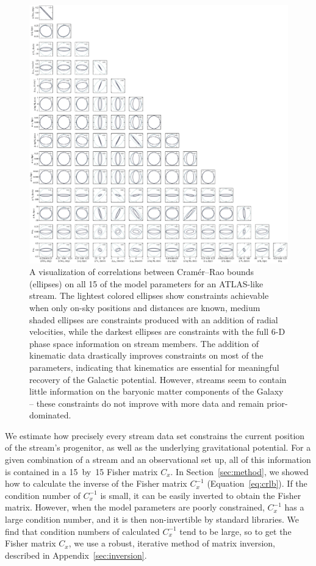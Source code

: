 \documentclass[modern]{aastex61}
\begin{document}
\begin{figure}
\begin{center}
\includegraphics[width=\textwidth]{crb_correlations.pdf}
\caption{A visualization of correlations between Cram\'er--Rao bounds (ellipses) on all 15 of the model parameters for an ATLAS-like stream.
The lightest colored ellipses show constraints achievable when only on-sky positions and distances are known, medium shaded ellipses are constraints produced with an addition of radial velocities, while the darkest ellipses are constraints with the full 6-D phase space information on stream members.
The addition of kinematic data drastically improves constraints on most of the parameters, indicating that kinematics are essential for meaningful recovery of the Galactic potential.
However, streams seem to contain little information on the baryonic matter components of the Galaxy -- these constraints do not improve with more data and remain prior-dominated.
}
\label{fig:crb_correlations}
\end{center}
\end{figure}

We estimate how precisely every stream data set constrains the current position of the stream's progenitor, as well as the underlying gravitational potential.
For a given combination of a stream and an observational set up, all of this information is contained in a 15~by~15 Fisher matrix $C_x$.
In Section~\ref{sec:method}, we showed how to calculate the inverse of the Fisher matrix $C_x^{-1}$ (Equation~\ref{eq:crlb}).
If the condition number of $C_x^{-1}$ is small, it can be easily inverted to obtain the Fisher matrix.
However, when the model parameters are poorly constrained, $C_x^{-1}$ has a large condition number, and it is then non-invertible by standard libraries.
We find that condition numbers of calculated $C_x^{-1}$ tend to be large, so to get the Fisher matrix $C_x$, we use a robust, iterative method of matrix inversion, described in Appendix~\ref{sec:inversion}.
\end{document}
